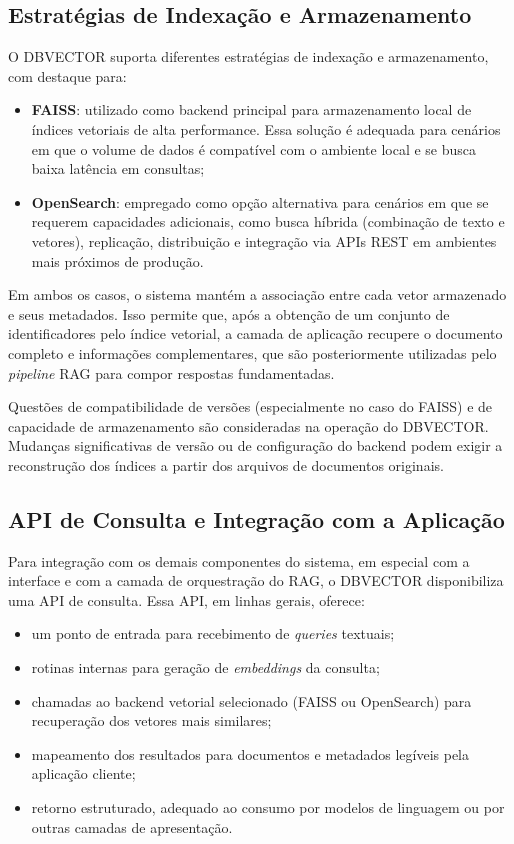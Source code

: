 \subsection{Estratégias de Indexação e Armazenamento}
O DBVECTOR suporta diferentes estratégias de indexação e armazenamento, com destaque para:

\begin{itemize}
  \item \textbf{FAISS}: utilizado como backend principal para armazenamento local de índices vetoriais de alta performance. Essa solução é adequada para cenários em que o volume de dados é compatível com o ambiente local e se busca baixa latência em consultas;
  \item \textbf{OpenSearch}: empregado como opção alternativa para cenários em que se requerem capacidades adicionais, como busca híbrida (combinação de texto e vetores), replicação, distribuição e integração via APIs REST em ambientes mais próximos de produção.
\end{itemize}

Em ambos os casos, o sistema mantém a associação entre cada vetor armazenado e seus metadados. Isso permite que, após a obtenção de um conjunto de identificadores pelo índice vetorial, a camada de aplicação recupere o documento completo e informações complementares, que são posteriormente utilizadas pelo \textit{pipeline} RAG para compor respostas fundamentadas.

Questões de compatibilidade de versões (especialmente no caso do FAISS) e de capacidade de armazenamento são consideradas na operação do DBVECTOR. Mudanças significativas de versão ou de configuração do backend podem exigir a reconstrução dos índices a partir dos arquivos de documentos originais.

\subsection{API de Consulta e Integração com a Aplicação}
Para integração com os demais componentes do sistema, em especial com a interface e com a camada de orquestração do RAG, o DBVECTOR disponibiliza uma API de consulta. Essa API, em linhas gerais, oferece:

\begin{itemize}
  \item um ponto de entrada para recebimento de \textit{queries} textuais;
  \item rotinas internas para geração de \textit{embeddings} da consulta;
  \item chamadas ao backend vetorial selecionado (FAISS ou OpenSearch) para recuperação dos vetores mais similares;
  \item mapeamento dos resultados para documentos e metadados legíveis pela aplicação cliente;
  \item retorno estruturado, adequado ao consumo por modelos de linguagem ou por outras camadas de apresentação.
\end{itemize}

